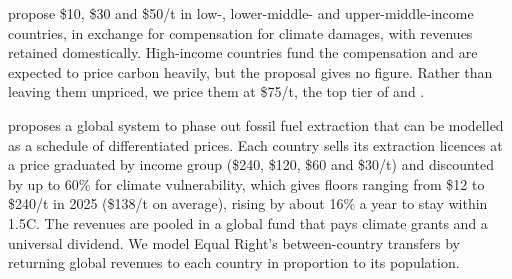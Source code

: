 \documentclass[12pt,english]{article}
\theoremstyle{remark}
\begin{document}
\citet{banerjee_grand_2025} propose \$10, \$30 and \$50/t in low-, lower-middle- and upper-middle-income countries, in exchange for compensation for climate damages, with revenues retained domestically. High-income countries fund the compensation and are expected to price carbon heavily, but the proposal gives no figure. Rather than leaving them unpriced, we price them at \$75/t, the top tier of \citet{parry_proposal_2021} and \citet{wolfram_building_2025}.

\citet{equal_right_climate_2023} proposes a global system to phase out fossil fuel extraction that can be modelled as a schedule of differentiated prices.  
Each country sells its extraction licences at a price graduated by income group (\$240, \$120, \$60 and \$30/t) and discounted by up to 60\% for climate vulnerability, which gives floors ranging from \$12 to \$240/t in 2025 (\$138/t on average), rising by about 16\% a year to stay within 1.5\textdegree C. 
The revenues are pooled in a global fund that pays climate grants and a universal dividend. We model Equal Right's between-country transfers by returning global revenues to each country in proportion to its population. 
\end{document}
